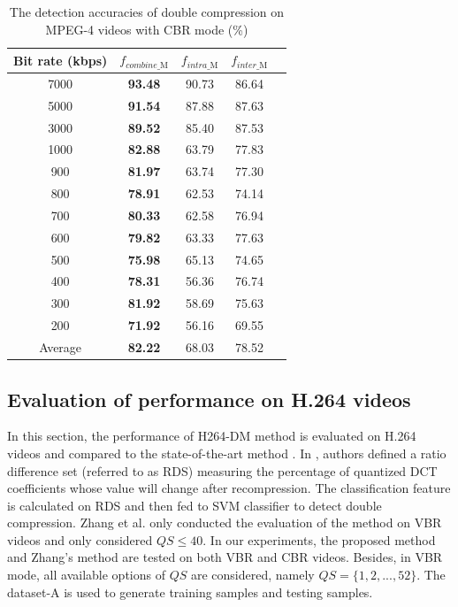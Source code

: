 \documentclass[journal,sort]{IEEEtran}
\begin{document}
\begin{table}[ht!]
	\centering
	\caption{\label{mpeg4-cbr}The detection accuracies of double compression on MPEG-4 videos with CBR mode (\%)}
	\begin{tabular}{ccccc}
		\toprule
		Bit rate (kbps)& $f_{combine\_\text{M}}$ & $f_{intra\_\text{M}}$ & $f_{inter\_\text{M}}$  \\\midrule
		7000 &\textbf{93.48}     &90.73    &86.64    \\
		5000 &\textbf{91.54}     &87.88    &87.63    \\
		3000 &\textbf{89.52}     &85.40    &87.53   \\\midrule
		1000 &\textbf{82.88}      &63.79    &77.83   \\
		900 &\textbf{81.97}     &63.74    &77.30    \\
		800 &\textbf{78.91}     &62.53    &74.14    \\
		700 &\textbf{80.33}     &62.58    &76.94    \\
		600 &\textbf{79.82}     &63.33    &77.63    \\
		500 &\textbf{75.98}     &65.13    &74.65    \\
		400 &\textbf{78.31}     &56.36    &76.74    \\\midrule
		300 &\textbf{81.92}     &58.69    &75.63    \\
		200 &\textbf{71.92}     &56.16    &69.55   \\\midrule
		Average &\textbf{82.22}   &68.03   &78.52  & \\\bottomrule
	\end{tabular}
\end{table}



\subsection{Evaluation of performance on H.264 videos\label{evaluation_h264}}
In this section, the performance of H264-DM method is evaluated on H.264 videos and compared to the state-of-the-art method \cite{zhang2016detecting}. In \cite{zhang2016detecting}, authors defined a ratio difference set (referred to as RDS) measuring the percentage of quantized DCT coefficients whose value will change after recompression. The classification feature is calculated on RDS and then fed to SVM classifier to detect double compression. Zhang et al. only conducted the evaluation of the method \cite{zhang2016detecting} on VBR videos and only considered $QS\leq 40$. In our experiments, the proposed method and Zhang's method are tested on both VBR and CBR videos. Besides, in VBR mode, all available options of $QS$ are considered, namely $QS = \{1,2,...,52\}$. The dataset-A is used to generate training samples and testing samples.
\end{document}
